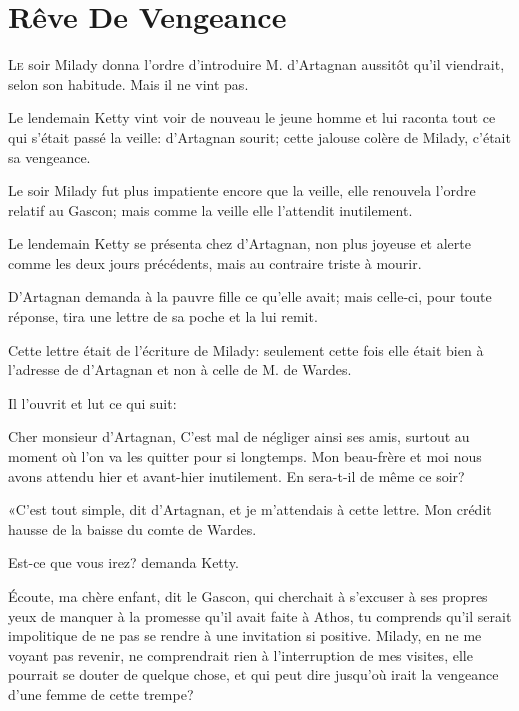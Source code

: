 
\chapter{Rêve De Vengeance}

\lettrine{L}{e} soir Milady donna l'ordre d'introduire M. d'Artagnan aussitôt qu'il viendrait, selon son habitude. Mais il ne vint pas. 

\zz
Le lendemain Ketty vint voir de nouveau le jeune homme et lui raconta tout ce qui s'était passé la veille: d'Artagnan sourit; cette jalouse colère de Milady, c'était sa vengeance. 

Le soir Milady fut plus impatiente encore que la veille, elle renouvela l'ordre relatif au Gascon; mais comme la veille elle l'attendit inutilement. 

Le lendemain Ketty se présenta chez d'Artagnan, non plus joyeuse et alerte comme les deux jours précédents, mais au contraire triste à mourir. 

D'Artagnan demanda à la pauvre fille ce qu'elle avait; mais celle-ci, pour toute réponse, tira une lettre de sa poche et la lui remit. 

Cette lettre était de l'écriture de Milady: seulement cette fois elle était bien à l'adresse de d'Artagnan et non à celle de M. de Wardes. 

Il l'ouvrit et lut ce qui suit: 

\begin{mail}{}{Cher monsieur d'Artagnan,}
C'est mal de négliger ainsi ses amis, surtout au moment où l'on va les quitter pour si longtemps. Mon beau-frère et moi nous avons attendu hier et avant-hier inutilement. En sera-t-il de même ce soir?

\end{mail}

«C'est tout simple, dit d'Artagnan, et je m'attendais à cette lettre. Mon crédit hausse de la baisse du comte de Wardes. 

\speak  Est-ce que vous irez? demanda Ketty. 

\speak  Écoute, ma chère enfant, dit le Gascon, qui cherchait à s'excuser à ses propres yeux de manquer à la promesse qu'il avait faite à Athos, tu comprends qu'il serait impolitique de ne pas se rendre à une invitation si positive. Milady, en ne me voyant pas revenir, ne comprendrait rien à l'interruption de mes visites, elle pourrait se douter de quelque chose, et qui peut dire jusqu'où irait la vengeance d'une femme de cette trempe? 

